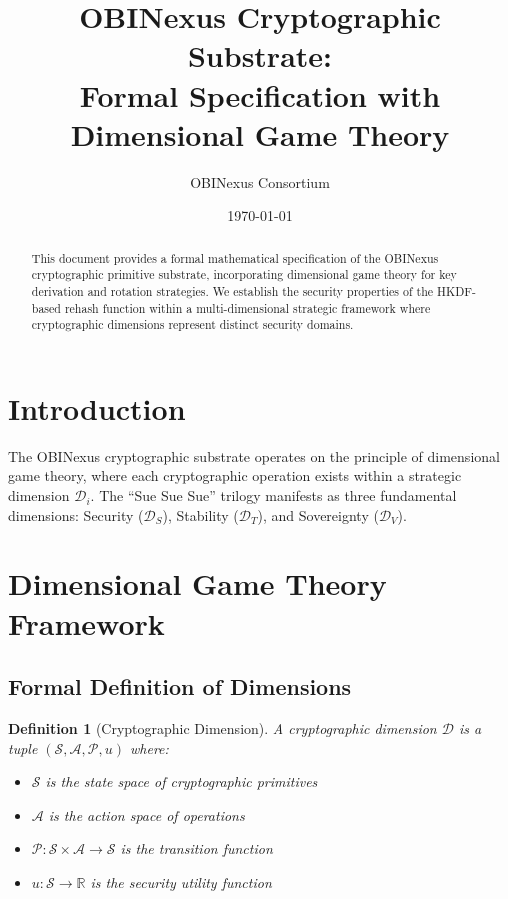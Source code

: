 \documentclass[11pt]{article}
\title{OBINexus Cryptographic Substrate:\\Formal Specification with Dimensional Game Theory}
\author{OBINexus Consortium}
\date{\today}
\newtheorem{definition}{Definition}
\begin{document}
\maketitle

\begin{abstract}
This document provides a formal mathematical specification of the OBINexus cryptographic primitive substrate, incorporating dimensional game theory for key derivation and rotation strategies. We establish the security properties of the HKDF-based rehash function within a multi-dimensional strategic framework where cryptographic dimensions represent distinct security domains.
\end{abstract}

\section{Introduction}

The OBINexus cryptographic substrate operates on the principle of dimensional game theory, where each cryptographic operation exists within a strategic dimension $\mathcal{D}_i$. The ``Sue Sue Sue'' trilogy manifests as three fundamental dimensions: Security ($\mathcal{D}_S$), Stability ($\mathcal{D}_T$), and Sovereignty ($\mathcal{D}_V$).

\section{Dimensional Game Theory Framework}

\subsection{Formal Definition of Dimensions}

\begin{definition}[Cryptographic Dimension]
A cryptographic dimension $\mathcal{D}$ is a tuple $(\mathcal{S}, \mathcal{A}, \mathcal{P}, u)$ where:
\begin{itemize}
    \item $\mathcal{S}$ is the state space of cryptographic primitives
    \item $\mathcal{A}$ is the action space of operations
    \item $\mathcal{P}: \mathcal{S} \times \mathcal{A} \rightarrow \mathcal{S}$ is the transition function
    \item $u: \mathcal{S} \rightarrow \mathbb{R}$ is the security utility function
\end{itemize}
\end{definition}
\end{document}
